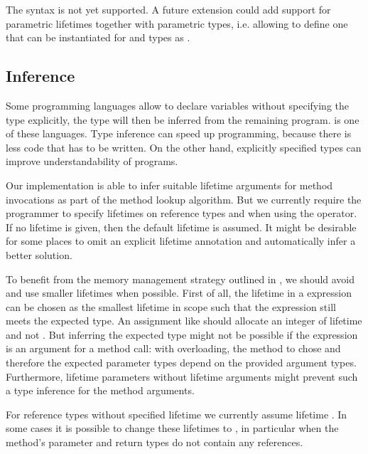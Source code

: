 The syntax  is not yet supported.
A future extension could add support for parametric lifetimes together with parametric types, i.e. allowing to define one  that can be instantiated for  and  types as .


\subsection*{Inference}
Some programming languages allow to declare variables without specifying the type explicitly, the type will then be inferred from the remaining program.
\rust is one of these languages.
Type inference can speed up programming, because there is less code that has to be written.
On the other hand, explicitly specified types can improve understandability of programs.

Our implementation is able to infer suitable lifetime arguments for method invocations as part of the method lookup algorithm.
But we currently require the programmer to specify lifetimes on reference types and when using the  operator.
If no lifetime is given, then the default lifetime \whileyinline{*} is assumed.
It might be desirable for some places to omit an explicit lifetime annotation and automatically infer a better solution.

To benefit from the memory management strategy outlined in , we should avoid \whileyinline{*} and use smaller lifetimes when possible.
First of all, the lifetime in a  expression can be chosen as the smallest lifetime in scope such that the expression still meets the expected type.
An assignment like  should allocate an integer of lifetime  and not \whileyinline{*}.
But inferring the expected type might not be possible if the expression is an argument for a method call:
with overloading, the method to chose and therefore the expected parameter types depend on the provided argument types.
Furthermore, lifetime parameters without lifetime arguments might prevent such a type inference for the method arguments.

For reference types without specified lifetime we currently assume lifetime \whileyinline{*}.
In some cases it is possible to change these lifetimes to , in particular when the method's parameter and return types do not contain any references.

